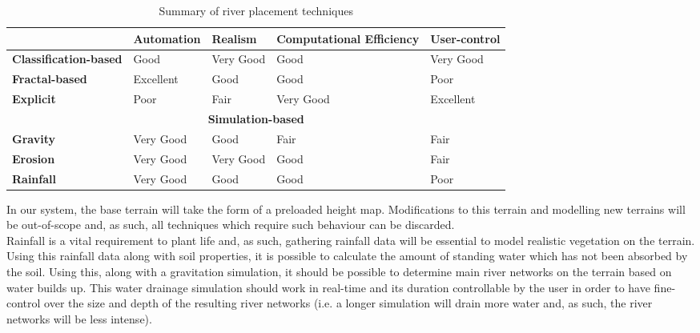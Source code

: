 \begin{table}[h]
  \centering
	  \label{Pros and cons of individual techniques}
	    \begin{tabular}{|p{4cm}|p{3cm}|p{3cm}|p{3cm}|p{3cm}|}
  	    \hline	
  	      & \textbf{Automation} & \textbf{Realism} & \textbf{Computational Efficiency} & \textbf{User-control} \\
		\hline	
		\textbf{Classification-based} & 
		 Good  & Very Good  & Good & Very Good  \\
  	    \hline	
		\textbf{Fractal-based} & 
		 Excellent & Good & Good & Poor  \\
  	    \hline
		\textbf{Explicit} & 
		 Poor & Fair & Very Good & Excellent   \\
  	    \hline
  	    \multicolumn{5}{|c|}{\textbf{Simulation-based}} \\
  	    \hline				
  	    \textbf{Gravity} & 
		 Very Good & Good & Fair & Fair   \\
  	    \hline
		\textbf{Erosion} & 
		 Very Good & Very Good & Good & Fair      \\
  	    \hline
  	    	\textbf{Rainfall} & 
		 Very Good & Good & Good & Poor      \\
  	    \hline		
  	    \end{tabular}
  \caption[Summary of river placement techniques]{Summary of river placement techniques}
\end{table}

In our system, the base terrain will take the form of a preloaded height map. Modifications to this terrain and modelling new terrains will be out-of-scope and, as such, all techniques which require such behaviour can be discarded.\\
Rainfall is a vital requirement to plant life and, as such, gathering rainfall data will be essential to model realistic vegetation on the terrain. Using this rainfall data along with soil properties, it is possible to calculate the amount of standing water which has not been absorbed by the soil. Using this, along with a gravitation simulation, it should be possible to determine main river networks on the terrain based on water builds up. This water drainage simulation should work in real-time and its duration controllable by the user in order to have fine-control over the size and depth of the resulting river networks (i.e. a longer simulation will drain more water and, as such, the river networks will be less intense).
